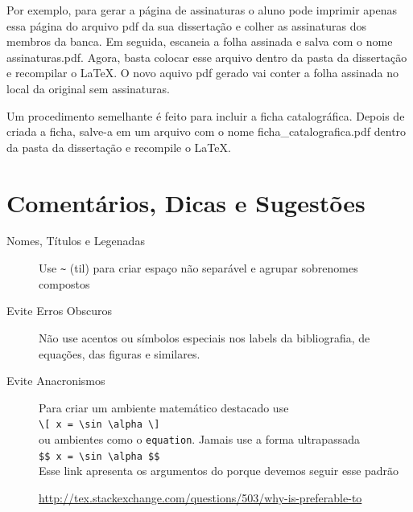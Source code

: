 \documentclass[fleqn]{profmat-cefet}
\begin{document}
Por exemplo, para gerar a página de assinaturas o aluno pode imprimir apenas 
essa página do arquivo \textsf{pdf} da sua dissertação e colher as assinaturas 
dos membros da banca. Em seguida, escaneia a folha assinada e salva com o nome
\textsf{assinaturas.pdf}. Agora, basta colocar esse arquivo dentro da pasta 
da dissertação e recompilar o \LaTeX{}. O novo aquivo \textsf{pdf} gerado 
vai conter a folha assinada no local da original sem assinaturas.

Um procedimento semelhante é feito para incluir a ficha catalográfica.
Depois de criada a ficha, salve-a em um arquivo com o nome
\textsf{ficha\_catalografica.pdf} dentro da pasta da dissertação e recompile o 
\LaTeX{}.

\section{Comentários, Dicas e Sugestões}
\label{sec:comentarios_dicas_e_sugestoes}

\begin{description}
    \item[Nomes, Títulos e Legenadas]
        Use \lstinline!~! (til) para criar espaço não separável e agrupar 
        sobrenomes compostos 

    \item[Evite Erros Obscuros]
        Não use acentos ou símbolos especiais nos \textsf{labels} da bibliografia,
        de equações, das figuras e similares.

    \item[Evite Anacronismos]
        Para criar um ambiente matemático destacado use \\
        \lstinline!\[ x = \sin \alpha \]! \\
        ou ambientes como o \lstinline!equation!. Jamais use a forma ultrapassada \\
        \lstinline!$$ x = \sin \alpha $$!\\
        Esse link apresenta os argumentos do porque devemos seguir esse padrão
        \begin{center}
            \url{http://tex.stackexchange.com/questions/503/why-is-preferable-to}
        \end{center}

\end{description}

\end{document}
